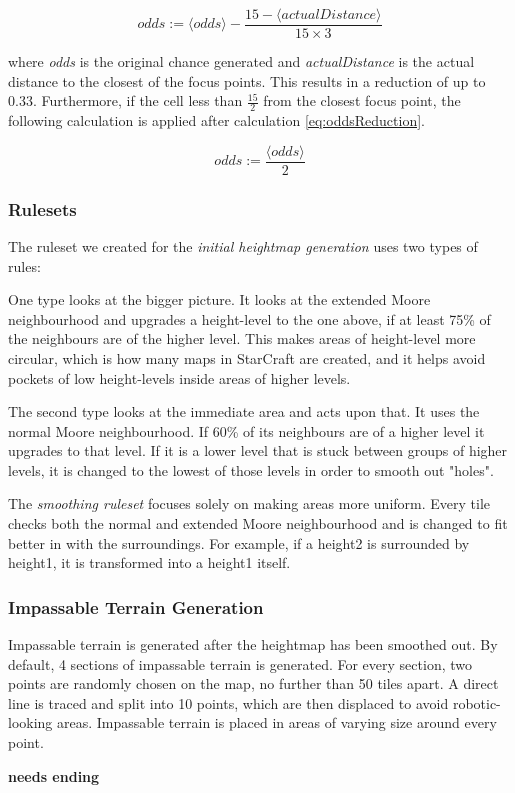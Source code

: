 \begin{equation} \label{eq:oddsReduction}
	odds := \langle odds\rangle - \frac{15 - \langle actualDistance\rangle}{15 \times 3}
\end{equation}

where \textit{odds} is the original chance generated and \textit{actualDistance} is the actual distance to the closest of the focus points. This results in a reduction of up to 0.33. Furthermore, if the cell less than $\frac{15}{2}$ from the closest focus point, the following calculation is applied after calculation \ref{eq:oddsReduction}.

\begin{equation}
	odds := \frac{\langle odds\rangle}{2}
\end{equation}

\subsubsection{Rulesets}
\label{methodology_ca_our_rulesets}

The ruleset we created for the \textit{initial heightmap generation} uses two types of rules:

One type looks at the bigger picture. It looks at the extended Moore neighbourhood and upgrades a height-level to the one above, if at least 75\% of the neighbours are of the higher level. This makes areas of height-level more circular, which is how many maps in StarCraft are created, and it helps avoid pockets of low height-levels inside areas of higher levels.

The second type looks at the immediate area and acts upon that. It uses the normal Moore neighbourhood. If 60\% of its neighbours are of a higher level it upgrades to that level. If it is a lower level that is stuck between groups of higher levels, it is changed to the lowest of those levels in order to smooth out "holes".

The \textit{smoothing ruleset} focuses solely on making areas more uniform. Every tile checks both the normal and extended Moore neighbourhood and is changed to fit better in with the surroundings. For example, if a height2 is surrounded by height1, it is transformed into a height1 itself.

\subsubsection{Impassable Terrain Generation}
\label{methodology_ca_our_impassable}

Impassable terrain is generated after the heightmap has been smoothed out. By default, 4 sections of impassable terrain is generated. For every section, two points are randomly chosen on the map, no further than 50 tiles apart. A direct line is traced and split into 10 points, which are then displaced to avoid robotic-looking areas. Impassable terrain is placed in areas of varying size around every point.

\textbf{needs ending}
